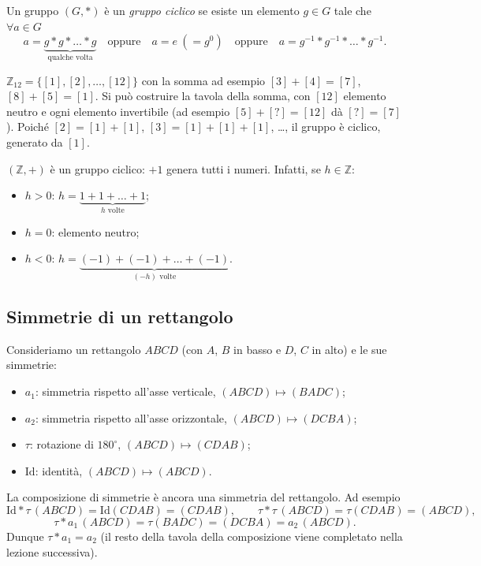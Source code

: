 \documentclass[11pt,a4paper]{article}
\begin{document}
\begin{definizione}
Un gruppo $(G, *)$ è un \emph{gruppo ciclico} se esiste un elemento $g \in G$ tale che $\forall a \in G$
\[
  a = \underbrace{g * g * \dots * g}_{\text{qualche volta}}
  \quad\text{oppure}\quad a = e\ (= g^0)
  \quad\text{oppure}\quad a = g^{-1} * g^{-1} * \dots * g^{-1} .
\]
\end{definizione}

\begin{esempio}
$\mathbb{Z}_{12} = \{[1], [2], \dots, [12]\}$ con la somma ad esempio $[3] + [4] = [7]$, $[8] + [5] = [1]$. Si può costruire la tavola della somma, con $[12]$ elemento neutro e ogni elemento invertibile (ad esempio $[5] + [?] = [12]$ dà $[?] = [7]$). Poiché $[2] = [1] + [1]$, $[3] = [1] + [1] + [1]$, \dots, il gruppo è ciclico, generato da $[1]$.
\end{esempio}

\begin{esempio}
$(\mathbb{Z}, +)$ è un gruppo ciclico: $+1$ genera tutti i numeri. Infatti, se $h \in \mathbb{Z}$:
\begin{itemize}
  \item $h > 0$: $h = \underbrace{1 + 1 + \dots + 1}_{h\text{ volte}}$;
  \item $h = 0$: elemento neutro;
  \item $h < 0$: $h = \underbrace{(-1) + (-1) + \dots + (-1)}_{(-h)\text{ volte}}$.
\end{itemize}
\end{esempio}

\subsection{Simmetrie di un rettangolo}

\begin{esempio}
Consideriamo un rettangolo $ABCD$ (con $A$, $B$ in basso e $D$, $C$ in alto) e le sue simmetrie:
\begin{itemize}
  \item $a_1$: simmetria rispetto all'asse verticale, $(ABCD) \mapsto (BADC)$;
  \item $a_2$: simmetria rispetto all'asse orizzontale, $(ABCD) \mapsto (DCBA)$;
  \item $\tau$: rotazione di $180^\circ$, $(ABCD) \mapsto (CDAB)$;
  \item $\mathrm{Id}$: identità, $(ABCD) \mapsto (ABCD)$.
\end{itemize}
La composizione di simmetrie è ancora una simmetria del rettangolo. Ad esempio
\[
  \mathrm{Id} * \tau\,(ABCD) = \mathrm{Id}(CDAB) = (CDAB), \qquad
  \tau * \tau\,(ABCD) = \tau(CDAB) = (ABCD),
\]
\[
  \tau * a_1\,(ABCD) = \tau(BADC) = (DCBA) = a_2\,(ABCD).
\]
Dunque $\tau * a_1 = a_2$ (il resto della tavola della composizione viene completato nella lezione successiva).
\end{esempio}
\end{document}
